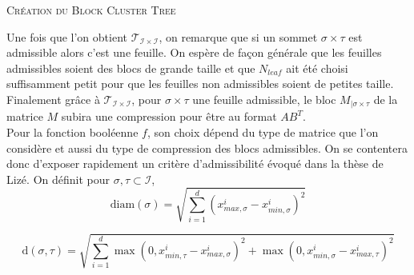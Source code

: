 \begin{algorithm}
\caption{\textsc{Création du Block Cluster Tree}}
\label{algoBlockClustTree}
\begin{algorithmic}
\END
\end{algorithmic}
\end{algorithm}
  

Une fois que l'on obtient $\mathcal{T}_{\mathcal{I} \times \mathcal{I}}$, on remarque que si un sommet $\sigma \times \tau$ est admissible alors c'est une feuille.
On espère de façon générale que les feuilles admissibles soient des blocs de grande taille et que $N_{leaf}$ ait été choisi suffisamment petit
pour que les feuilles non admissibles soient de petites taille.
Finalement grâce à $\mathcal{T}_{\mathcal{I} \times \mathcal{I}}$, pour $\sigma \times \tau$ une feuille admissible, le bloc $M_{|\sigma \times \tau}$ de la matrice $M$
subira une compression pour être au format $AB^{T}$.\\

Pour la fonction booléenne $f$, son choix dépend du type de matrice que l'on considère et aussi du type de compression des blocs admissibles. On se contentera
donc d'exposer rapidement un critère d'admissibilité évoqué dans la thèse de Lizé. On définit pour $\sigma, \tau \subset \mathcal{I}$,
\begin{equation}
 \mathrm{diam}(\sigma)= \sqrt{\displaystyle\sum_{i=1}^{d} (x_{max,\sigma}^{i} - x_{min,\sigma}^{i})^2}
\end{equation}

\begin{equation}
 \mathrm{d}(\sigma,\tau) = \sqrt{\displaystyle\sum_{i=1}^{d} \max(0,x_{min,\tau}^{i} - x_{max,\sigma}^{i})^2 + \max(0,x_{min,\sigma}^{i} - x_{max,\tau}^{i})^2 } 
\end{equation}

